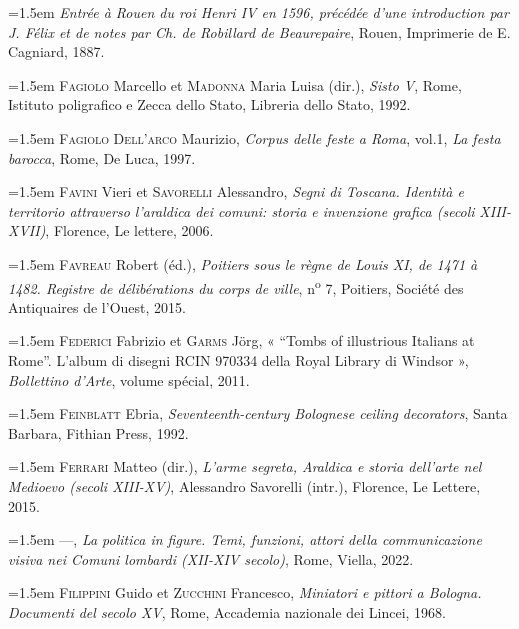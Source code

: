 \documentclass[12pt,twoside,openany]{book}
\newenvironment{PurhBibliography}
  {%
    \par
    \setlength{\parindent}{0pt}%
    \setlength{\leftskip}{0pt}%
  }
  {%
    \par
  }
\begin{document}
\begin{PurhBibliography}
\noindent\hangindent=1.5em \textit{Entrée à Rouen du roi Henri IV en 1596, précédée d’une introduction par J. Félix et de notes par Ch. de Robillard de Beaurepaire}, Rouen, Imprimerie de E. Cagniard, 1887.\par
\noindent\hangindent=1.5em \textsc{Fagiolo} Marcello et \textsc{Madonna} Maria Luisa (dir.), \textit{Sisto V}, Rome, Istituto poligrafico e Zecca dello Stato, Libreria dello Stato, 1992.\par
\noindent\hangindent=1.5em \textsc{Fagiolo Dell’arco} Maurizio, \textit{Corpus delle feste a Roma}, vol.1,\textit{ La festa barocca}, Rome, De Luca, 1997.\par
\noindent\hangindent=1.5em \textsc{Favini} Vieri et \textsc{Savorelli} Alessandro, \textit{Segni di Toscana. Identità e territorio attraverso l’araldica dei comuni: storia e invenzione grafica (secoli }\textit{\textsc{XIII}}\textit{-}\textit{\textsc{XVII}}\textit{)}, Florence, Le lettere, 2006.\par
\noindent\hangindent=1.5em \textsc{Favreau} Robert (éd.), \textit{Poitiers sous le règne de Louis XI, de 1471 à 1482. Registre de délibérations du corps de ville}, n\textsuperscript{o} 7, Poitiers, Société des Antiquaires de l’Ouest, 2015.\par
\noindent\hangindent=1.5em \textsc{Federici} Fabrizio et \textsc{Garms} Jörg, « “Tombs of illustrious Italians at Rome”. L’album di disegni \textsc{RCIN} 970334 della Royal Library di Windsor », \textit{Bollettino d’Arte}, volume spécial, 2011.\par
\noindent\hangindent=1.5em \textsc{Feinblatt} Ebria, \textit{Seventeenth-century Bolognese ceiling decorators}, Santa Barbara, Fithian Press, 1992.\par
\noindent\hangindent=1.5em \textsc{Ferrari} Matteo (dir.), \textit{L’arme segreta, Araldica e storia dell’arte nel Medioevo (secoli XIII-XV)}, Alessandro Savorelli (intr.), Florence, Le Lettere, 2015.\par
\noindent\hangindent=1.5em \textsc{—}, \textit{La politica in figure. Temi, funzioni, attori della communicazione visiva nei Comuni lombardi (XII-XIV secolo)}, Rome, Viella, 2022.\par
\noindent\hangindent=1.5em \textsc{Filippini} Guido et \textsc{Zucchini} Francesco,\textit{ Miniatori e pittori a Bologna. Documenti del secolo XV}, Rome, Accademia nazionale dei Lincei, 1968.\par

\end{PurhBibliography}
\end{document}
